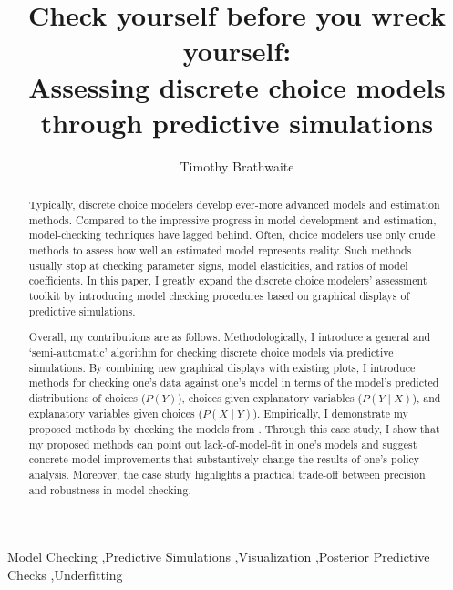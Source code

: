 \documentclass[preprint]{elsarticle}
\begin{document}
\begin{frontmatter}

\title{Check yourself before you wreck yourself: \\Assessing discrete choice models through predictive simulations}

\author[tbrathwaite]{Timothy Brathwaite}


\address[tbrathwaite]{Lyft Inc.\\ 185 Berry Street, Suite 5000, San Francisco, CA, 94107}

\begin{abstract}
Typically, discrete choice modelers develop ever-more advanced models and estimation methods. Compared to the impressive progress in model development and estimation, model-checking techniques have lagged behind. Often, choice modelers use only crude methods to assess how well an estimated model represents reality. Such methods usually stop at checking parameter signs, model elasticities, and ratios of model coefficients. In this paper, I greatly expand the discrete choice modelers' assessment toolkit by introducing model checking procedures based on graphical displays of predictive simulations. 

Overall, my contributions are as follows. Methodologically, I introduce a general and `semi-automatic' algorithm for checking discrete choice models via predictive simulations. By combining new graphical displays with existing plots, I introduce methods for checking one's data against one's model in terms of the model's predicted distributions of choices ($P \left( Y \right)$), choices given explanatory variables ($P \left( Y \mid X \right)$), and explanatory variables given choices ($P \left( X \mid Y \right)$). Empirically, I demonstrate my proposed methods by checking the models from \citet{brownstone_forecasting_1998}. Through this case study, I show that my proposed methods can point out lack-of-model-fit in one's models and suggest concrete model improvements that substantively change the results of one's policy analysis. Moreover, the case study highlights a practical trade-off between precision and robustness in model checking.
\end{abstract}

\begin{keyword}
Model Checking \sep Predictive Simulations \sep Visualization \sep Posterior Predictive Checks \sep Underfitting
\end{keyword}
\end{frontmatter}
\end{document}
